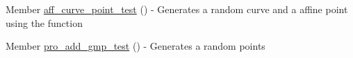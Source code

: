 
\begin{DoxyRefList}
\item[Member \mbox{\hyperlink{test_8h_aaa36281bb7646e7fed52a08f549332b3}{aff\+\_\+curve\+\_\+point\+\_\+test}} ()]\label{test__test000001}%
%
-\/ Generates a random curve and a affine point using the function 
\item[Member \mbox{\hyperlink{test_8h_a82dddc5d5006d1ddc2a3c57eeed79764}{pro\+\_\+add\+\_\+gmp\+\_\+test}} ()]\label{test__test000002}%
%
-\/ Generates a random points 
\end{DoxyRefList}
